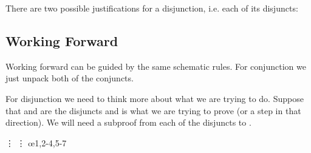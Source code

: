 \begin{fitchrule} There are two possible justifications
  for a disjunction, i.e. each of its disjuncts:\\
  \label{def:proving-disjunctions}
  \leavevmode
\end{fitchrule}

\subsection{Working Forward}

Working forward can be guided by the same schematic rules. For conjunction we
just unpack both of the conjuncts.

\begin{fitchrule}
  \label{def:unpacking-conjunctions}
  \leavevmode
  \vspace{-0.9\baselineskip}
  \begin{fitchproof}
     {\ephi\eand\epsi} 
     {\ephi}
     {\epsi}
  \end{fitchproof}  
\end{fitchrule}

For disjunction we need to think more about what we are trying to do. Suppose
that \sphi and \spsi are the disjuncts and \schi is what we are trying to
prove (or a step in that direction). We will need a subproof from each of
the disjuncts to \echi.

\begin{fitchrule}
  \label{def:unpacking-disjunctions}
  \leavevmode
  \vspace{-0.9\baselineskip}
  \begin{fitchproof}
     {\ephi\eor\epsi}
    \open
     {\ephi} 
     {\vdots}
     {\echi}
    \close    
    \open
     {\ephi} 
     {\vdots}
     {\echi}
    \close
     {\echi} \oe{1,2-4,5-7}
  \end{fitchproof}  
\end{fitchrule}


